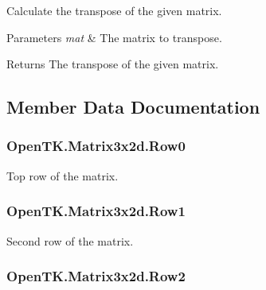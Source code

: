 Calculate the transpose of the given matrix. 


\begin{DoxyParams}{Parameters}
{\em mat} & The matrix to transpose.\\
\hline
\end{DoxyParams}
\begin{DoxyReturn}{Returns}
The transpose of the given matrix.
\end{DoxyReturn}


\subsection{Member Data Documentation}
\hypertarget{struct_open_t_k_1_1_matrix3x2d_afdcdf97888e382fb30672979cb76b7ac}{
\subsubsection[{Row0}]{ Open\-T\-K.\-Matrix3x2d.\-Row0}}\label{struct_open_t_k_1_1_matrix3x2d_afdcdf97888e382fb30672979cb76b7ac}


Top row of the matrix. 

\hypertarget{struct_open_t_k_1_1_matrix3x2d_a0362d2d628d029c63f8cd59f7fd58b19}{
\subsubsection[{Row1}]{ Open\-T\-K.\-Matrix3x2d.\-Row1}}\label{struct_open_t_k_1_1_matrix3x2d_a0362d2d628d029c63f8cd59f7fd58b19}


Second row of the matrix. 

\hypertarget{struct_open_t_k_1_1_matrix3x2d_a91d77d1d58b78d8452df851a9abdbb2d}{
\subsubsection[{Row2}]{ Open\-T\-K.\-Matrix3x2d.\-Row2}}\label{struct_open_t_k_1_1_matrix3x2d_a91d77d1d58b78d8452df851a9abdbb2d}


